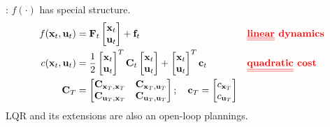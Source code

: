 : $f(\cdot)$ has special structure.
\begin{align}
	f(\textbf{x}_t, \textbf{u}_t) &= \textbf{F}_t \begin{bmatrix}
		\textbf{x}_t\\
		\textbf{u}_t
	\end{bmatrix} + \textbf{f}_t && \text{\textbf{\color{red} \underline{\underline{linear}} dynamics}}\\
	c(\textbf{x}_t, \textbf{u}_t) &= \frac{1}{2} \begin{bmatrix}
		\textbf{x}_t\\
		\textbf{u}_t
	\end{bmatrix}^T \textbf{C}_t \begin{bmatrix}
		\textbf{x}_t\\
		\textbf{u}_t
	\end{bmatrix} + \begin{bmatrix}
		\textbf{x}_t\\
		\textbf{u}_t
	\end{bmatrix}^T \textbf{c}_t && \text{\textbf{\color{red} \underline{\underline{quadratic}} cost}}\\
	\textbf{C}_T &= \begin{bmatrix}
		\textbf{C}_{\textbf{x}_T, \textbf{x}_T} & \textbf{C}_{\textbf{x}_T, \textbf{u}_T}\\
		\textbf{C}_{\textbf{u}_T, \textbf{x}_T} & \textbf{C}_{\textbf{u}_T, \textbf{u}_T}
	\end{bmatrix}; \quad \textbf{c}_T = \begin{bmatrix}
		c_{\textbf{x}_T}\\
		c_{\textbf{u}_T}
	\end{bmatrix}
\end{align}
\note \ac{LQR} and its extensions are also an open-loop plannings.

